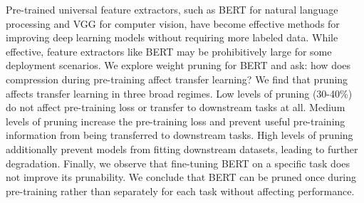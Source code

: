 Pre-trained universal feature extractors, such as BERT for natural language processing and VGG for computer vision, have become effective methods for improving deep learning models without requiring more labeled data. While effective, feature extractors like BERT may be prohibitively large for some deployment scenarios. We explore weight pruning for BERT and ask: how does compression during pre-training affect transfer learning? We find that pruning affects transfer learning in three broad regimes. Low levels of pruning (30-40\%) do not affect pre-training loss or transfer to downstream tasks at all. Medium levels of pruning increase the pre-training loss and prevent useful pre-training information from being transferred to downstream tasks. High levels of pruning additionally prevent models from fitting downstream datasets, leading to further degradation. Finally, we observe that fine-tuning BERT on a specific task does not improve its prunability. We conclude that BERT can be pruned once during pre-training rather than separately for each task without affecting performance.
